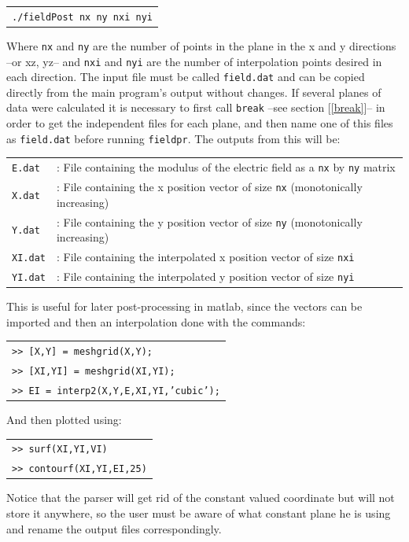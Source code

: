 \documentclass[12pt]{article}
\begin{document}
\begin{tabular}{l}
\texttt{./fieldPost nx ny nxi nyi}
\end{tabular}

Where \verb+nx+ and \verb+ny+ are the number of points in the plane in the x and y directions --or xz, yz-- and \verb+nxi+ and \verb+nyi+ are the number of interpolation points desired in each direction. The input file must be called \verb+field.dat+ and can be copied directly from the main program's output without changes. If several planes of data were calculated it is necessary to first call \verb+break+ --see section [\ref{break}]-- in order to get the independent files for each plane, and then name one of this files as \verb+field.dat+ before running \verb+fieldpr+. The outputs from this will be:

\begin{tabular}{ll}
\texttt{E.dat} &: File containing the modulus of the electric field as a \verb+nx+ by \verb+ny+ matrix\\
\texttt{X.dat} &: File containing the x position vector of size \verb+nx+ (monotonically increasing)\\
\texttt{Y.dat} &: File containing the y position vector of size \verb+ny+ (monotonically increasing)\\
\texttt{XI.dat} &: File containing the interpolated x position vector of size \verb+nxi+\\
\texttt{YI.dat} &: File containing the interpolated y position vector of size \verb+nyi+
\end{tabular}

This is useful for later post-processing in matlab, since the vectors can be imported and then an interpolation done with the commands:

\begin{tabular}{l}
\texttt{>> [X,Y] = meshgrid(X,Y);}\\
\texttt{>> [XI,YI] = meshgrid(XI,YI);}\\
\texttt{>> EI = interp2(X,Y,E,XI,YI,'cubic');}
\end{tabular}

And then plotted using:

\begin{tabular}{l}
\texttt{>> surf(XI,YI,VI)}\\
\texttt{>> contourf(XI,YI,EI,25)}
\end{tabular}

Notice that the parser will get rid of the constant valued coordinate but will not store it anywhere, so the user must be aware of what constant plane he is using and rename the output files correspondingly.
\end{document}
